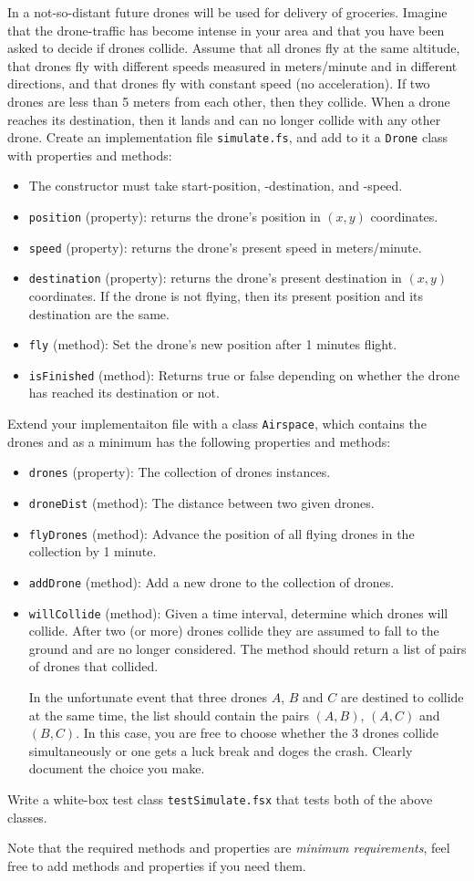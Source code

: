 In a not-so-distant future drones will be used for delivery of
groceries. Imagine that the drone-traffic has become intense in your
area and that you have been asked to decide if drones collide. Assume
that all drones fly at the same altitude, that drones fly with
different speeds measured in meters/minute and in different
directions, and that drones fly with constant speed (no
acceleration). If two drones are less than 5 meters from each other,
then they collide. When a drone reaches its destination, then it lands
and can no longer collide with any other drone. Create an implementation
file \lstinline{simulate.fs}, and add to it a \lstinline{Drone} class
with properties and methods:

\begin{itemize}
\item The constructor must take start-position, -destination, and -speed.
\item \lstinline{position} (property): returns the drone's position in $(x, y)$ coordinates.
\item \lstinline{speed} (property): returns the drone's present speed in meters/minute.
\item \lstinline{destination} (property): returns the drone's present destination in $(x, y)$ coordinates. If the drone is not flying, then its present position and its destination are the same.
\item \lstinline{fly} (method): Set the drone's new position after 1 minutes flight.
\item \lstinline{isFinished} (method): Returns true or false depending on whether the drone has reached its destination or not.
\end{itemize}

Extend your implementaiton file with a class \lstinline{Airspace}, which contains the drones and as a minimum has the following properties and methods:
\begin{itemize}
\item \lstinline{drones} (property): The collection of drones instances.
\item \lstinline{droneDist} (method): The distance between two given drones.
\item \lstinline{flyDrones} (method): Advance the position of all flying drones in the collection by 1 minute.
\item \lstinline{addDrone} (method): Add a new drone to the collection of drones.
\item \lstinline{willCollide} (method): Given a time interval,
  determine which drones will collide. After two (or more) drones
  collide they are assumed to fall to the ground and are no longer
  considered. The method should return a list of pairs of drones that
  collided.

  In the unfortunate event that three drones $A$, $B$ and $C$ are
  destined to collide at the same time, the list should contain the
  pairs $(A,B)$, $(A, C)$ and $(B,C)$. In this case, you are free to
  choose whether the 3 drones collide simultaneously or one gets a
  luck break and doges the crash. Clearly document the choice you
  make.
\end{itemize}

Write a white-box test class \lstinline{testSimulate.fsx} that tests
both of the above classes.

Note that the required methods and properties are \emph{minimum
  requirements}, feel free to add methods and properties if you need them.